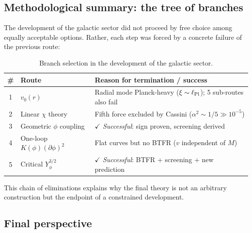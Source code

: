 \documentclass[11pt,a4paper]{article}
\numberwithin{equation}{section}
\begin{document}
\subsection{Methodological summary: the tree of branches}
\label{app:lof:tree}

The development of the galactic sector did not proceed by free
choice among equally acceptable options. Rather, each step was
forced by a concrete failure of the previous route:

\begin{table}[H]
\centering
\caption{Branch selection in the development of the galactic
sector.}
\label{tab:lof_branches}
\small
\begin{tabular}{clp{7.5cm}}
\hline
\textbf{\#} & \textbf{Route} &
\textbf{Reason for termination / success} \\
\hline
1 & $v_0(r)$ & Radial mode Planck-heavy
  ($\xi \sim \ell_{\rm Pl}$); 5 sub-routes also fail \\
2 & Linear $\chi$ theory & Fifth force excluded by Cassini
  ($\alpha^2 \sim 1/5 \gg 10^{-5}$) \\
3 & Geometric $\phi$ coupling & $\checkmark$ \emph{Successful}:
  sign proven, screening derived \\
4 & One-loop $K(\phi)(\partial\phi)^2$ & Flat curves but no
  BTFR ($v$ independent of $M$) \\
5 & Critical $Y_\phi^{3/2}$ & $\checkmark$ \emph{Successful}:
  BTFR + screening + new prediction \\
\hline
\end{tabular}
\end{table}

This chain of eliminations explains why the final theory is
not an arbitrary construction but the endpoint of a constrained
development.


\subsection{Final perspective}
\end{document}
